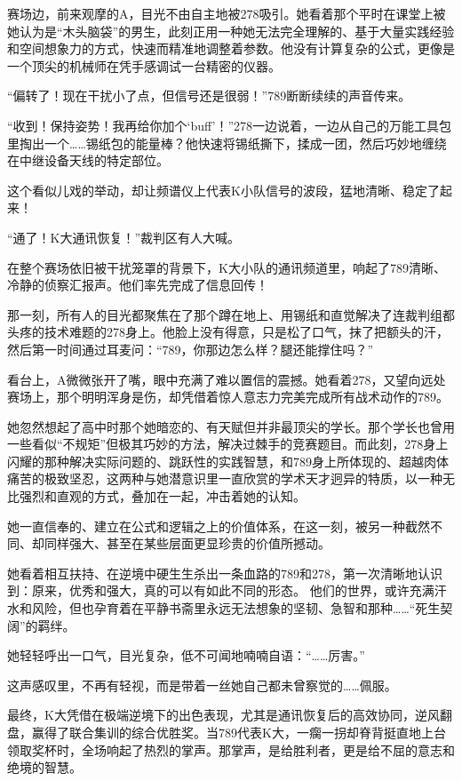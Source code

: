 \documentclass[a4paper]{book}
\begin{document}
赛场边，前来观摩的A，目光不由自主地被278吸引。她看着那个平时在课堂上被她认为是“木头脑袋”的男生，此刻正用一种她无法完全理解的、基于大量实践经验和空间想象力的方式，快速而精准地调整着参数。他没有计算复杂的公式，更像是一个顶尖的机械师在凭手感调试一台精密的仪器。

“偏转了！现在干扰小了点，但信号还是很弱！”789断断续续的声音传来。

“收到！保持姿势！我再给你加个‘buff’！”278一边说着，一边从自己的万能工具包里掏出一个……锡纸包的能量棒？他快速将锡纸撕下，揉成一团，然后巧妙地缠绕在中继设备天线的特定部位。

这个看似儿戏的举动，却让频谱仪上代表K小队信号的波段，猛地清晰、稳定了起来！

“通了！K大通讯恢复！”裁判区有人大喊。

在整个赛场依旧被干扰笼罩的背景下，K大小队的通讯频道里，响起了789清晰、冷静的侦察汇报声。他们率先完成了信息回传！

那一刻，所有人的目光都聚焦在了那个蹲在地上、用锡纸和直觉解决了连裁判组都头疼的技术难题的278身上。他脸上没有得意，只是松了口气，抹了把额头的汗，然后第一时间通过耳麦问：“789，你那边怎么样？腿还能撑住吗？”

看台上，A微微张开了嘴，眼中充满了难以置信的震撼。她看着278，又望向远处赛场上，那个明明浑身是伤，却凭借着惊人意志力完美完成所有战术动作的789。

她忽然想起了高中时那个她暗恋的、有天赋但并非最顶尖的学长。那个学长也曾用一些看似“不规矩”但极其巧妙的方法，解决过棘手的竞赛题目。而此刻，278身上闪耀的那种解决实际问题的、跳跃性的实践智慧，和789身上所体现的、超越肉体痛苦的极致坚忍，这两种与她潜意识里一直欣赏的学术天才迥异的特质，以一种无比强烈和直观的方式，叠加在一起，冲击着她的认知。

她一直信奉的、建立在公式和逻辑之上的价值体系，在这一刻，被另一种截然不同、却同样强大、甚至在某些层面更显珍贵的价值所撼动。

她看着相互扶持、在逆境中硬生生杀出一条血路的789和278，第一次清晰地认识到：原来，优秀和强大，真的可以有如此不同的形态。 他们的世界，或许充满汗水和风险，但也孕育着在平静书斋里永远无法想象的坚韧、急智和那种……“死生契阔”的羁绊。

她轻轻呼出一口气，目光复杂，低不可闻地喃喃自语：“……厉害。”

这声感叹里，不再有轻视，而是带着一丝她自己都未曾察觉的……佩服。

最终，K大凭借在极端逆境下的出色表现，尤其是通讯恢复后的高效协同，逆风翻盘，赢得了联合集训的综合优胜奖。当789代表K大，一瘸一拐却脊背挺直地上台领取奖杯时，全场响起了热烈的掌声。那掌声，是给胜利者，更是给不屈的意志和绝境的智慧。
\end{document}
